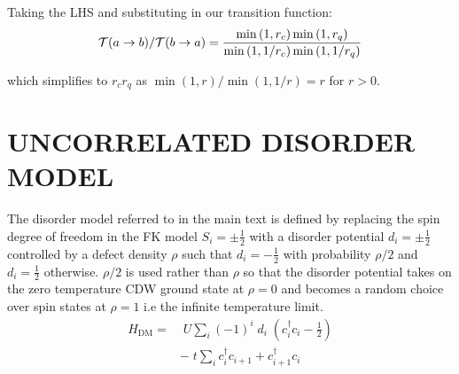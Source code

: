 Taking the LHS and substituting in our transition function: \[\begin{aligned}
\mathcal{T}(a \to b)/\mathcal{T}(b \to a) = \frac{\min\left(1, r_c\right) \min\left(1, r_q\right)}{ \min\left(1, 1/r_c\right) \min\left(1, 1/r_q\right)}\end{aligned}\]

which simplifies to \(r_c r_q\) as \(\min(1,r)/\min(1,1/r) = r\) for \(r > 0\).

\hypertarget{uncorrelated-disorder-model}{%
\section[ UNCORRELATED DISORDER MODEL]{\texorpdfstring{\protect\hypertarget{app:disorder_model}{}{} UNCORRELATED DISORDER MODEL}{ UNCORRELATED DISORDER MODEL}}\label{uncorrelated-disorder-model}}

The disorder model referred to in the main text is defined by replacing the spin degree of freedom in the FK model \(S_i = \pm \tfrac{1}{2}\) with a disorder potential \(d_i = \pm \tfrac{1}{2}\) controlled by a defect density \(\rho\) such that \(d_i = -\tfrac{1}{2}\) with probability \(\rho/2\) and \(d_i = \tfrac{1}{2}\) otherwise. \(\rho/2\) is used rather than \(\rho\) so that the disorder potential takes on the zero temperature CDW ground state at \(\rho = 0\) and becomes a random choice over spin states at \(\rho = 1\) i.e the infinite temperature limit. ~ \[\begin{aligned}
H_{\mathrm{DM}} = & \;U \sum_{i} (-1)^i \; d_i \;(c^\dag_{i}c_{i} - \tfrac{1}{2}) \\
& -\;t \sum_{i} c^\dag_{i}c_{i+1} + c^\dag_{i+1}c_{i} \nonumber\end{aligned}\]

\begin{Shaded}
\begin{Highlighting}[]

\end{Highlighting}
\end{Shaded}
